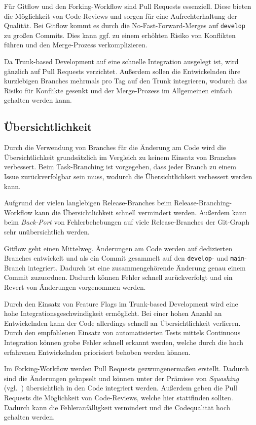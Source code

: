 Für Gitflow und den Forking\hyp Workflow sind Pull Requests essenziell. Diese bieten die Möglichkeit von Code\hyp Reviews und sorgen für eine Aufrechterhaltung der Qualität. Bei Gitflow kommt es durch die No\hyp Fast\hyp Forward\hyp Merges auf \texttt{develop} zu großen Commits. Dies kann ggf. zu einem erhöhten Risiko von Konflikten führen und den Merge\hyp Prozess verkomplizieren.

Da Trunk\hyp based Development auf eine schnelle Integration ausgelegt ist, wird gänzlich auf Pull Requests verzichtet. Außerdem sollen die Entwickelnden ihre kurzlebigen Branches mehrmals pro Tag auf den Trunk integrieren, wodurch das Risiko für Konflikte gesenkt und der Merge\hyp Prozess im Allgemeinen einfach gehalten werden kann.


\subsection{Übersichtlichkeit}

Durch die Verwendung von Branches für die Änderung am Code wird die Übersichtlichkeit grundsätzlich im Vergleich zu keinem Einsatz von Branches verbessert. Beim Task\hyp Branching ist vorgegeben, dass jeder Branch zu einem Issue zurückverfolgbar sein muss, wodurch die Übersichtlichkeit verbessert werden kann.

Aufgrund der vielen langlebigen Release\hyp Branches beim Release\hyp Branching\hyp Workflow kann die Übersichtlichkeit schnell vermindert werden. Außerdem kann beim \emph{Back\hyp Port} von Fehlerbehebungen auf viele Release\hyp Branches der Git\hyp Graph sehr unübersichtlich werden.

Gitflow geht einen Mittelweg. Änderungen am Code werden auf dedizierten Branches entwickelt und als ein Commit gesammelt auf den \texttt{develop}- und \texttt{main}\hyp Branch integriert. Dadurch ist eine zusammengehörende Änderung genau einem Commit zuzuordnen. Dadurch können Fehler schnell zurückverfolgt und ein Revert von Änderungen vorgenommen werden.

Durch den Einsatz von Feature Flags im Trunk\hyp based Development wird eine hohe Integrationsgeschwindigkeit ermöglicht. Bei einer hohen Anzahl an Entwickelnden kann der Code allerdings schnell an Übersichtlichkeit verlieren. Durch den empfohlenen Einsatz von automatisierten Tests mittels Continuous Integration können grobe Fehler schnell erkannt werden, welche durch die hoch erfahrenen Entwickelnden priorisiert behoben werden können.

Im Forking\hyp Workflow werden Pull Requests gezwungenermaßen erstellt. Dadurch sind die Änderungen gekapselt und können unter der Prämisse von \emph{Squashing} (vgl.~\cite{githubincPullRequestMerges2024}) übersichtlich in den Code integriert werden. Außerdem geben die Pull Requests die Möglichkeit von Code\hyp Reviews, welche hier stattfinden sollten. Dadurch kann die Fehleranfälligkeit vermindert und die Codequalität hoch gehalten werden.


